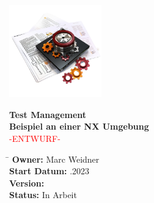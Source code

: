 \documentclass[ngerman,parskip=half*,listof=totoc]{scrartcl}
\begin{document}
\begin{titlepage}
	\begin{center} %
		\includegraphics[width=4cm]{pics/logo} %
		\vspace{1cm} %
		
		\Huge \textbf{Test Management}\\ %
		\vspace{0.5cm} %
		\Large \textbf{Beispiel an einer NX Umgebung}\\ %
		\vspace{0.5cm} %
		\large \textcolor{red}{-ENTWURF-} %
		
		\vspace{10cm} %
		

			\begin{tabbing}
			\hspace{5cm}\=\kill
			\textbf{Owner:}\> Marc Weidner \\
			\textbf{Start Datum:} .2023 \\ 
			\textbf{Version:} \\
			\textbf{Status: }\> In Arbeit \\
		\end{tabbing} 
	

		
		\vfill %

	\end{center}
\end{titlepage}
	\tableofcontents
	\pagebreak	

\end{document}
